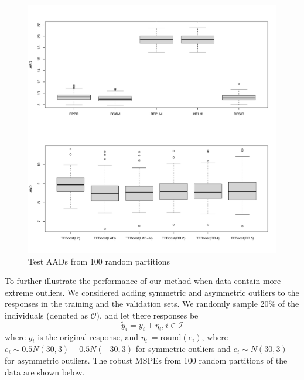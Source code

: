\documentclass{article}
\begin{document}
\begin{figure}
	\includegraphics[scale = 0.5]{figs/Frui_Fly.pdf}
	\caption{Test AADs from 100 random partitions}
	\label{fig:ori}
\end{figure}


To further illustrate the performance of our method when data contain more extreme outliers. We considered adding symmetric and asymmetric outliers to the responses in the training and the validation sets. We randomly sample 20\% of the individuals (denoted as $\mathcal{O}$), and let there responses be 
$$\tilde{y}_{i} = y_i + \eta_i, i \in \mathcal{I}$$ 
where $y_i$ is the original response, and $\eta_i \ = \text{round}(e_i)$, where $e_i \sim 0.5N(30, 3) + 0.5N(-30, 3)$ for symmetric outliers and $e_i \sim N(30, 3)$ for asymmetric outliers. The robust MSPEs from 100 random partitions of the data are shown below. 
\end{document}
